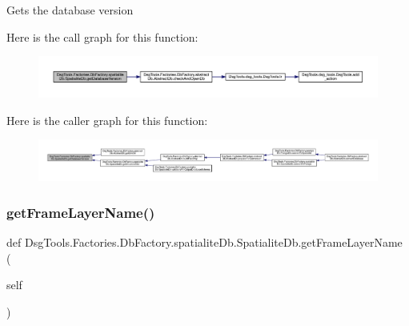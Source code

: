 \begin{DoxyVerb}Gets the database version
\end{DoxyVerb}
 Here is the call graph for this function\+:
\nopagebreak
\begin{figure}[H]
\begin{center}
\leavevmode
\includegraphics[width=350pt]{class_dsg_tools_1_1_factories_1_1_db_factory_1_1spatialite_db_1_1_spatialite_db_a69bc40bb88ed07db887aa94a652bf0c5_cgraph}
\end{center}
\end{figure}
Here is the caller graph for this function\+:
\nopagebreak
\begin{figure}[H]
\begin{center}
\leavevmode
\includegraphics[width=350pt]{class_dsg_tools_1_1_factories_1_1_db_factory_1_1spatialite_db_1_1_spatialite_db_a69bc40bb88ed07db887aa94a652bf0c5_icgraph}
\end{center}
\end{figure}
\mbox{\label{class_dsg_tools_1_1_factories_1_1_db_factory_1_1spatialite_db_1_1_spatialite_db_a1566bb6fb78ce6c2a7866ee18775debd}} 
\subsubsection{\texorpdfstring{get\+Frame\+Layer\+Name()}{getFrameLayerName()}}
{\footnotesize\ttfamily def Dsg\+Tools.\+Factories.\+Db\+Factory.\+spatialite\+Db.\+Spatialite\+Db.\+get\+Frame\+Layer\+Name (\begin{DoxyParamCaption}\item[{}]{self }\end{DoxyParamCaption})}

